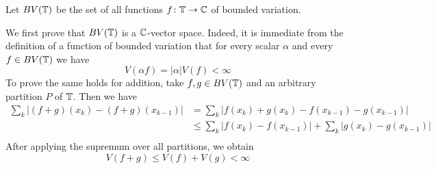\documentclass[a4paper, 12pt]{article}
\begin{document}
\begin{Exercise}
    Let $BV(\mathbb{T})$ be the set of all functions $f \colon \mathbb{T} \to \mathbb{C}$ of bounded variation.

    We first prove that $BV(\mathbb{T})$ is a $\mathbb{C}$-vector space.
    Indeed, it is immediate from the definition of a function of bounded variation that for every scalar $\alpha$ and every $f \in BV(\mathbb{T})$ we have
    \begin{equation}
        \label{eq:15-abshomog}
        V(\alpha f) = |\alpha| V(f) < \infty
    \end{equation}
    To prove the same holds for addition, take $f, g \in BV(\mathbb{T})$ and an arbitrary partition $P$ of $\mathbb{T}$.
    Then we have
    \begin{align*}
        \sum_{k} |(f + g)(x_k) - (f + g)(x_{k-1})|
        &= \sum_{k} |f(x_k) + g(x_k) - f(x_{k-1}) - g(x_{k-1})| \\
        &\leq \sum_{k} |f(x_k) - f(x_{k-1})| + \sum_{k} |g(x_k) - g(x_{k-1})| \\
    \end{align*}
    After applying the supremum over all partitions, we obtain
    \begin{equation}
        \label{eq:15-triangle}
        V(f + g) \leq V(f) + V(g) < \infty
    \end{equation}
    

\end{Exercise}
\end{document}
